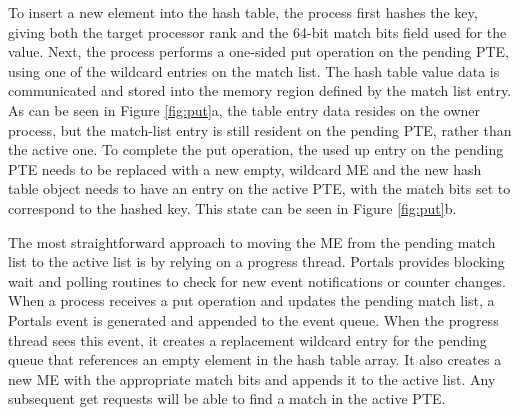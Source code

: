 
To insert a new element into the hash table, the process first hashes
the key, giving both the target processor rank and the 64-bit match
bits field used for the value. Next, the process performs a one-sided
put operation on the pending PTE, using one of the wildcard entries on
the match list. The hash table value data is communicated and stored
into the memory region defined by the match list entry. As can be seen
in Figure \ref{fig:put}a, the table entry data resides on the owner
process, but the match-list entry is still resident on the pending
PTE, rather than the active one. To complete the put operation, the
used up entry on the pending PTE needs to be replaced with a new empty,
wildcard ME and the new hash table object needs to have an entry on
the active PTE, with the match bits set to correspond to the hashed
key. This state can be seen in Figure \ref{fig:put}b. 

The most straightforward approach to moving the ME from the pending 
match list to the active list is by relying on a progress
thread. Portals provides blocking wait and polling routines to check
for new event notifications or counter changes. When a process
receives a put operation and updates the pending match list, a Portals
event is generated and appended to the event queue. When the progress
thread sees this event, it creates a replacement wildcard entry for
the pending queue that references an empty element in the hash table
array. It also creates a new ME with the appropriate match bits and
appends it to the active list. Any subsequent get requests will be
able to find a match in the active PTE.









